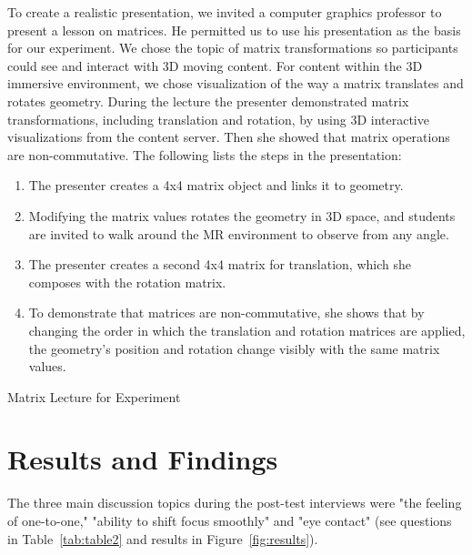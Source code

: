 \documentclass[sigchi-a]{acmart}
\begin{document}
\begin{sidebar}
To create a realistic presentation, we invited a computer graphics professor to present a lesson on matrices. He permitted us to use his presentation as the basis for our experiment.
We chose the topic of matrix transformations so participants could see and interact with 3D moving content. 
For content within the 3D immersive environment, we chose visualization of the way a matrix translates and rotates geometry. 
During the lecture the presenter demonstrated matrix transformations, including translation and rotation, by using 3D interactive visualizations from the content server. Then she showed that matrix operations are non-commutative.
The following lists the steps in the presentation:
\begin{enumerate}
  \item The presenter creates a 4x4 matrix object and links it to geometry. 
  \item Modifying the matrix values rotates the geometry in 3D space, and students are invited to walk around the MR environment to observe from any angle. 
  \item The presenter creates a second 4x4 matrix for translation, which she composes with the rotation matrix.
  \item To demonstrate that matrices are non-commutative, she shows that by changing the order in which the translation and rotation matrices are applied, the geometry's position and rotation change visibly with the same matrix values.
  \end{enumerate}
  \caption{Matrix Lecture for Experiment}
  \label{sidebar:matrix}
\end{sidebar}

\section{Results and Findings}

The three main discussion topics during the post-test interviews were "the feeling of one-to-one," "ability to shift focus smoothly" and "eye contact" (see questions in Table~\ref{tab:table2} and results in Figure~\ref{fig:results}). 
\end{document}
